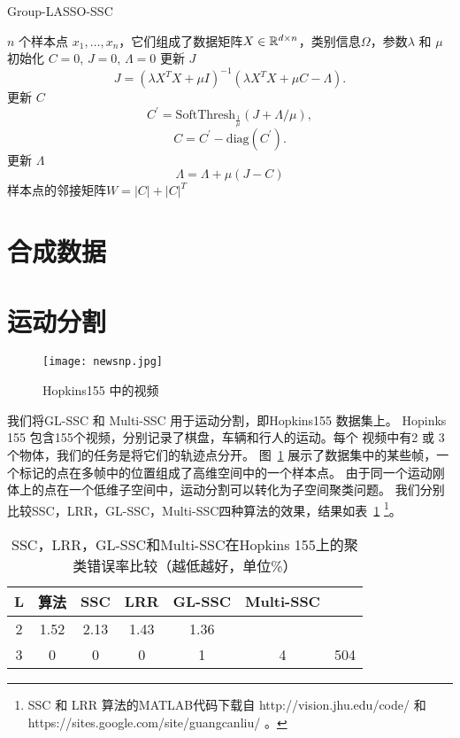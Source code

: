 \documentclass[main.tex]{subfiles}
\begin{document}
\begin{algorithm}[tb]
  \caption{Group-LASSO-SSC}
  \label{alg:MatrixSSC}
  \begin{algorithmic}
    $n$ 个样本点 $x_1,\ldots,x_n$，它们组成了数据矩阵$X\in \mathbb{R}^{d\times n}$，类别信息$\Omega$，参数$\lambda$ 和 $\mu$
    \State 初始化 $C=0$, $J=0$, $\Lambda=0$
     更新 $J$ 
    $$J=(\lambda X^TX+\mu I)^{-1}(\lambda X^TX+\mu C-\Lambda).$$
     更新 $C$
    $$ C^{'}=\mathrm{SoftThresh}_{\frac{1}{\mu}}\left(J+\Lambda/\mu\right), $$
    $$ C=C^{'}-\mathrm{diag}(C^{'}).$$
     更新 $\Lambda$
    $$\Lambda=\Lambda+\mu(J-C)$$
    \EndWhile
     样本点的邻接矩阵$W=|C|+|C|^T$
  \end{algorithmic}
\end{algorithm}

\section{合成数据}

\section{运动分割}
\begin{figure}[tb]
  \centering
  \texttt{[image: newsnp.jpg]}
  \caption{Hopkins155 中的视频 }
  \label{snpsht}
\end{figure}
我们将GL-SSC 和 Multi-SSC 用于运动分割，即Hopkins155 \cite{tron2007benchmark}
数据集上。 Hopinks 155 包含155个视频，分别记录了棋盘，车辆和行人的运动。每个
视频中有2 或 3 个物体，我们的任务是将它们的轨迹点分开。
图~\ref{snpsht}
展示了数据集中的某些帧，一个标记的点在多帧中的位置组成了高维空间中的一个样本点。
由于同一个运动刚体上的点在一个低维子空间中，运动分割可以转化为子空间聚类问题。
我们分别比较SSC，LRR，GL-SSC，Multi-SSC四种算法的效果，结果如表~\ref{tab:hopkins}
\footnote{SSC 和 LRR 算法的MATLAB代码下载自 http://vision.jhu.edu/code/ 和
https://sites.google.com/site/guangcanliu/ 。}。
\begin{table}[h]
  \label{tab:hopkins}
  \centering
  \begin{tabular}{|c | c |c| c | c | c | c | }
	\hline
	L & 算法 & SSC & LRR & GL-SSC & Multi-SSC \\
	\hline  \hline
	2 & 1.52 & 2.13& 1.43 & 1.36 \\
	\hline
	3 & 0 & 0 & 0  &  1 & 4 & 504 \\
	\hline
  \end{tabular}
  \caption{SSC，LRR，GL-SSC和Multi-SSC在Hopkins
  155上的聚类错误率比较（越低越好，单位\%）}
\end{table}
\end{document}
